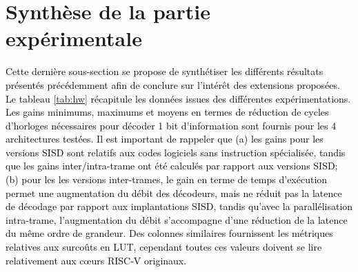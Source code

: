 \documentclass[../main.tex]{subfiles}
\begin{document}
\section{Synthèse de la partie expérimentale}
%
%
%
\textcolor{black}{Cette dernière sous-section se propose de synthétiser les différents résultats présentés  précédemment afin de conclure sur l'intérêt des extensions proposées. 
Le tableau \ref{tab:hw} récapitule les données issues des différentes expérimentations. 
Les gains minimums, maximums et moyens en termes de réduction de cycles d'horloges nécessaires pour décoder 1 bit d'information sont fournis pour les 4 architectures testées. 
Il est important de rappeler que (a) les gains pour les versions SISD sont relatifs aux codes logiciels sans instruction spécialisée, tandis que les gains inter/intra-trame ont été calculés par rapport aux versions SISD;  (b) pour les les versions inter-trames, le gain en terme de temps d'exécution permet une augmentation du débit des décodeurs, mais ne réduit pas la latence de décodage par rapport aux implantations SISD, tandis qu'avec la parallélisation intra-trame, l'augmentation du débit s'accompagne d'une réduction de la latence du même ordre de grandeur. 
Des colonnes similaires fournissent les métriques relatives aux surcoûts en LUT, cependant toutes ces valeurs doivent se lire relativement aux cœurs RISC-V originaux.}
\end{document}
